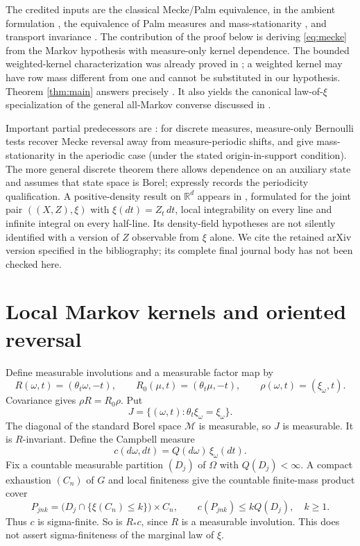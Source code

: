 \documentclass[11pt]{article}
\newcommand{\MM}{\mathcal M}
\begin{document}
The credited inputs are the classical Mecke/Palm equivalence, in the ambient formulation \cite[(2.7)]{LT09}, the equivalence of Palm measures and mass-stationarity \cite[Theorem 6.3]{LT09}, and transport invariance \cite[Theorem 4.1]{LT09}. The contribution of the proof below is deriving \eqref{eq:mecke} from the Markov hypothesis with measure-only kernel dependence. The bounded weighted-kernel characterization was already proved in \cite[Theorem 7.2]{LT09}; a weighted kernel may have row mass different from one and cannot be substituted in our hypothesis. Theorem \ref{thm:main} answers precisely \cite[Problem 7.3]{LT09}. It also yields the canonical law-of-$\xi$ specialization of the general all-Markov converse discussed in \cite[pp.\ 2692, 2694]{OWR}.

Important partial predecessors are \cite[Propositions 3.6 and 3.8]{LT11}: for discrete measures, measure-only Bernoulli tests recover Mecke reversal away from measure-periodic shifts, and give mass-stationarity in the aperiodic case (under the stated origin-in-support condition). The more general discrete theorem there allows dependence on an auxiliary state and assumes that state space is Borel; \cite[Remark 3.11]{LT11} expressly records the periodicity qualification. A positive-density result on $\mathbb R^d$ appears in \cite[Theorem 6]{LT15v2}, formulated for the joint pair $((X,Z),\xi)$ with $\xi(dt)=Z_t\,dt$, local integrability on every line and infinite integral on every half-line. Its density-field hypotheses are not silently identified with a version of $Z$ observable from $\xi$ alone. We cite the retained arXiv version specified in the bibliography; its complete final journal body has not been checked here.

\section{Local Markov kernels and oriented reversal}

Define measurable involutions and a measurable factor map by
\[
 R(\omega,t)=(\theta_t\omega,-t),\qquad
 R_0(\mu,t)=(\theta_t\mu,-t),\qquad
 \rho(\omega,t)=(\xi_\omega,t).
\]
Covariance gives $\rho R=R_0\rho$. Put
\[
 J=\{(\omega,t):\theta_t\xi_\omega=\xi_\omega\}.
\]
The diagonal of the standard Borel space $\MM$ is measurable, so $J$ is measurable. It is $R$-invariant. Define the Campbell measure
\[
 c(d\omega,dt)=Q(d\omega)\,\xi_\omega(dt).
\]
Fix a countable measurable partition $(D_j)$ of $\Omega$ with $Q(D_j)<\infty$. A compact exhaustion $(C_n)$ of $G$ and local finiteness give the countable finite-mass product cover
\begin{equation}
 P_{jnk}=\bigl(D_j\cap\{\xi(C_n)\leq k\}\bigr)\times C_n,
 \qquad c(P_{jnk})\leq kQ(D_j),\quad k\geq1. \label{eq:cover}
\end{equation}
Thus $c$ is sigma-finite. So is $R_*c$, since $R$ is a measurable involution. This does not assert sigma-finiteness of the marginal law of $\xi$.
\end{document}
